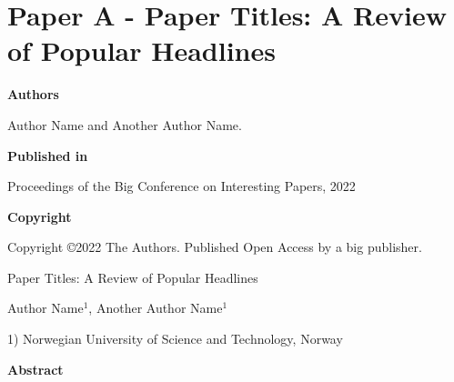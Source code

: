 \chapter{Paper A - Paper Titles: A Review of Popular Headlines}

\noindent \textbf{Authors}

\vspace*{0.3cm}

\noindent Author Name and Another Author Name.

\vspace*{0.7cm}

\noindent \textbf{Published in}

\vspace*{0.3cm}

\noindent Proceedings of the Big Conference on Interesting Papers, 2022

\vspace*{0.7cm}

\noindent \textbf{Copyright}

\vspace*{0.3cm}

\noindent Copyright ©2022 The Authors. Published Open Access by a big publisher.
\paperthumb
\newpage

\vspace*{0.1cm}

\begin{center}

\Huge{Paper Titles: A Review of Popular Headlines}

\vspace{0.6cm}

\large{Author Name$^{1}$, Another Author Name$^{1}$}

\vspace{0.1cm}

\small{1) Norwegian University of Science and Technology, Norway}
\end{center}

\vspace{0.2cm}

\begin{center}
  \textbf{Abstract}
\end{center}
\begin{changemargin}{0.75cm}{0.75cm} 
\lipsum[2]
\end{changemargin}

\vspace{1cm}

